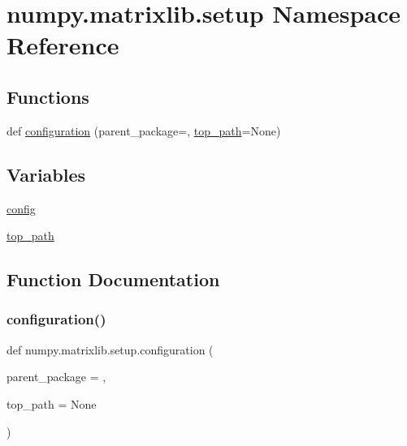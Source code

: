 \hypertarget{namespacenumpy_1_1matrixlib_1_1setup}{}\section{numpy.\+matrixlib.\+setup Namespace Reference}
\label{namespacenumpy_1_1matrixlib_1_1setup}
\subsection*{Functions}
\begin{DoxyCompactItemize}
\item 
def \hyperlink{namespacenumpy_1_1matrixlib_1_1setup_a30bb420bdca261107db3902cf50a1d95}{configuration} (parent\+\_\+package=\textquotesingle{}\textquotesingle{}, \hyperlink{namespacenumpy_1_1matrixlib_1_1setup_aafd2f43a0c68da57411e261ede2ee8ca}{top\+\_\+path}=None)
\end{DoxyCompactItemize}
\subsection*{Variables}
\begin{DoxyCompactItemize}
\item 
\hyperlink{namespacenumpy_1_1matrixlib_1_1setup_a1474580c3b0450539ee5a4c03836d7b1}{config}
\item 
\hyperlink{namespacenumpy_1_1matrixlib_1_1setup_aafd2f43a0c68da57411e261ede2ee8ca}{top\+\_\+path}
\end{DoxyCompactItemize}


\subsection{Function Documentation}
\mbox{\label{namespacenumpy_1_1matrixlib_1_1setup_a30bb420bdca261107db3902cf50a1d95}} 
\subsubsection{\texorpdfstring{configuration()}{configuration()}}
{\footnotesize\ttfamily def numpy.\+matrixlib.\+setup.\+configuration (\begin{DoxyParamCaption}\item[{}]{parent\+\_\+package = {\ttfamily \textquotesingle{}\textquotesingle{}},  }\item[{}]{top\+\_\+path = {\ttfamily None} }\end{DoxyParamCaption})}



